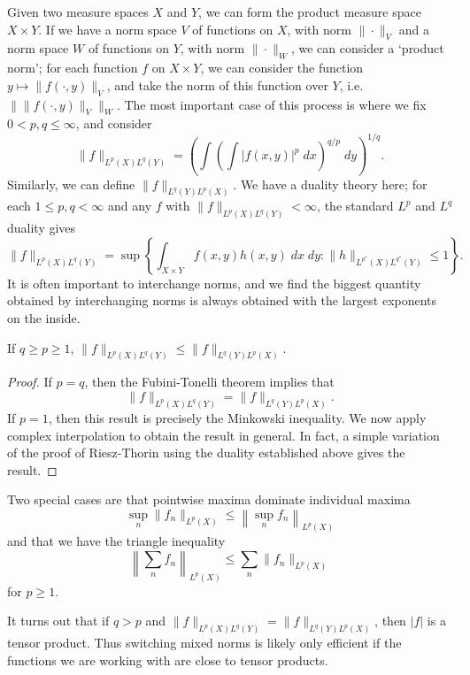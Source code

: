Given two measure spaces $X$ and $Y$, we can form the product measure space $X \times Y$. If we have a norm space $V$ of functions on $X$, with norm $\| \cdot \|_V$ and a norm space $W$ of functions on $Y$, with norm $\| \cdot \|_W$, we can consider a `product norm'; for each function $f$ on $X \times Y$, we can consider the function $y \mapsto \| f(\cdot,y) \|_V$, and take the norm of this function over $Y$, i.e. $\| \| f(\cdot,y) \|_V \|_W$. The most important case of this process is where we fix $0 < p,q \leq \infty$, and consider
%
\[ \| f \|_{L^p(X) L^q(Y)} = \left( \int \left( \int |f(x,y)|^p \; dx \right)^{q/p}\; dy \right)^{1/q}. \]
%
Similarly, we can define $\| f \|_{L^q(Y) L^p(X)}$. We have a duality theory here; for each $1 \leq p,q < \infty$ and any $f$ with $\| f \|_{L^p(X) L^q(Y)} < \infty$, the standard $L^p$ and $L^q$ duality gives
%
\[ \| f \|_{L^p(X) L^q(Y)} = \sup \left\{ \int_{X \times Y} f(x,y) h(x,y)\; dx\;dy : \| h \|_{L^{p^*}(X) L^{q^*}(Y)} \leq 1 \right\}. \]
%
It is often important to interchange norms, and we find the biggest quantity obtained by interchanging norms is always obtained with the largest exponents on the inside.

\begin{theorem}
	If $q \geq p \geq 1$, $\| f \|_{L^p(X) L^q(Y)} \leq \| f \|_{L^q(Y) L^p(X)}$.
\end{theorem}
\begin{proof}
  If $p = q$, then the Fubini-Tonelli theorem implies that
  \[ \| f \|_{L^p(X) L^q(Y)} = \| f \|_{L^q(Y) L^p(X)}. \]
  If $p = 1$, then this result is precisely the Minkowski inequality. We now apply complex interpolation to obtain the result in general. In fact, a simple variation of the proof of Riesz-Thorin using the duality established above gives the result.
\end{proof}

Two special cases are that pointwise maxima dominate individual maxima
%
\[ \sup_n \| f_n \|_{L^p(X)} \leq \left\| \sup_n f_n \right\|_{L^p(X)} \]
%
and that we have the triangle inequality
%
\[ \left\| \sum_n f_n \right\|_{L^p(X)} \leq \sum_n \| f_n \|_{L^p(X)} \]
%
for $p \geq 1$.

It turns out that if $q > p$ and $\| f \|_{L^p(X) L^q(Y)} = \| f \|_{L^q(Y) L^p(X)}$, then $|f|$ is a tensor product. Thus switching mixed norms is likely only efficient if the functions we are working with are close to tensor products.

